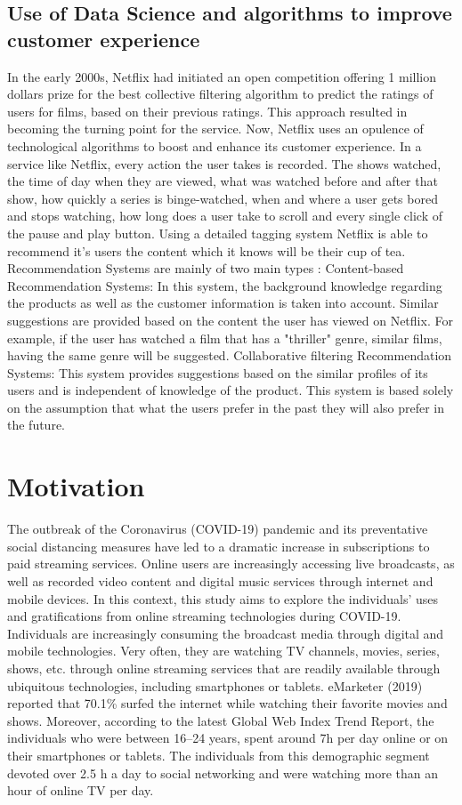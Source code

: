 \subsection{Use of Data Science and algorithms to improve customer experience}
In the early 2000s, Netflix had initiated an open competition offering 1 million dollars prize for the best collective filtering algorithm to predict the ratings of users for films, based on their previous ratings. This approach resulted in becoming the turning point for the service.
Now, Netflix uses an opulence of technological algorithms to boost and enhance its customer experience.
In a service like Netflix, every action the user takes is recorded. The shows watched, the time of day when they are viewed, what was watched before and after that show, how quickly a series is binge-watched, when and where a user gets bored and stops watching, how long does a user take to scroll and every single click of the pause and play button. Using a detailed tagging system Netflix is able to recommend it’s users the content which it knows will be their cup of tea.
Recommendation Systems are mainly of two main types :
Content-based Recommendation Systems: In this system, the background knowledge regarding the products as well as the customer information is taken into account. Similar suggestions are provided based on the content the user has viewed on Netflix. For example, if the user has watched a film that has a "thriller" genre, similar films, having the same genre will be suggested.
Collaborative filtering Recommendation Systems: This system provides suggestions based on the similar profiles of its users and is independent of knowledge of the product. This system is based solely on the assumption that what the users prefer in the past they will also prefer in the future.

\section{Motivation}
The outbreak of the Coronavirus (COVID-19) pandemic and its preventative social distancing measures have led to a dramatic increase in subscriptions to paid streaming services. Online users are increasingly accessing live broadcasts, as well as recorded video content and digital music services through internet and mobile devices. In this context, this study aims to explore the individuals’ uses and gratifications from online streaming technologies during COVID-19.
Individuals are increasingly consuming the broadcast media through digital and mobile technologies. Very often, they are watching TV channels, movies, series, shows, etc. through online streaming services that are readily available through ubiquitous technologies, including smartphones or tablets. 
eMarketer (2019) reported that 70.1\% surfed the internet while watching their favorite movies and shows. Moreover, according to the latest Global Web Index Trend Report, the individuals who were between 16–24 years, spent around 7h per day online or on their smartphones or tablets. The individuals from this demographic segment devoted over 2.5 h a day to social networking and were watching more than an hour of online TV per day.\newline

